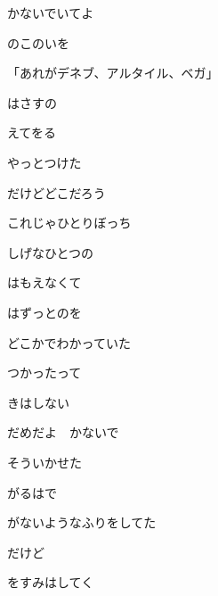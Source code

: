 \documentclass[a4paper,tate,twocolumn,12pt]{ltjtarticle}
\begin{document}
\begin{flushleft}
\begin{minipage}{\linewidth}
かないでいてよ

のこのいを
\end{minipage}

\vspace{2em}

\noindent\begin{minipage}{\linewidth}
「あれがデネブ、アルタイル、ベガ」

はさすの

えてをる

やっとつけた

だけどどこだろう

これじゃひとりぼっち
\end{minipage}

\vspace{2em}

\noindent\begin{minipage}{\linewidth}
しげなひとつの

はもえなくて
\end{minipage}

\vspace{2em}

\noindent\begin{minipage}{\linewidth}
はずっとのを

どこかでわかっていた

つかったって

きはしない

だめだよ　かないで

そういかせた
\end{minipage}

\vspace{2em}

\noindent\begin{minipage}{\linewidth}
がるはで

がないようなふりをしてた

だけど

をすみはしてく


\end{minipage}
\end{flushleft}
\end{document}
